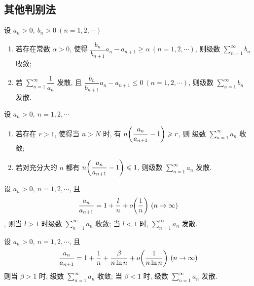 \subsection{其他判别法}

\begin{theorem}
    设 $a_n>0,~b_n>0~(n=1,2, \cdots )$\begin{enumerate}[label=(\arabic{*})]
        \item 若存在常数 $\alpha>0$, 使得 $\dfrac{b_n}{b_{n+1}}a_n-a_{n+1}\geqslant \alpha~(n=1,2, \cdots )$, 则级数 $\displaystyle \sum_{n=1}^{\infty}b_n$ 收敛;
        \item 若 $\displaystyle \sum_{n=1}^{\infty}\dfrac{1}{a_n}$ 发散, 且 $\dfrac{b_n}{b_{n+1}}a_n-a_{n+1}\leqslant 0~(n=1,2, \cdots )$, 则级数 $\displaystyle \sum_{n=1}^{\infty}b_n$ 发散.
    \end{enumerate}
\end{theorem}

\begin{theorem}
    设 $a_n>0,~n=1,2, \cdots $\begin{enumerate}[label=(\arabic{*})]
        \item 若存在 $r>1$, 使得当 $n>N$ 时, 有 $n\qty(\dfrac{a_n}{a_{n+1}}-1)\geqslant r$, 则 级数 $\displaystyle \sum_{n=1}^{\infty}a_n$ 收敛;
        \item 若对充分大的 $n$ 都有 $n\qty(\dfrac{a_n}{a_{n+1}}-1)\leqslant 1$, 则级数 $\displaystyle \sum_{n=1}^{\infty}a_n$ 发散.
    \end{enumerate}
\end{theorem}

\begin{theorem}
    设 $a_n>0,~n=1,2, \cdots $, 且 $$\dfrac{a_n}{a_{n+1}}=1+\dfrac{l}{n}+o\qty(\dfrac{1}{n}) ~(n\to \infty)$$, 则当 $l>1$ 时级数 $\displaystyle \sum_{n=1}^{\infty} a_n$ 收敛; 当 $l<1$ 时, $\displaystyle \sum_{n=1}^{\infty} a_n$ 发散.
\end{theorem}

\begin{theorem}
    设 $a_n>0,~n=1,2, \cdots $, 且 $$
        \dfrac{a_n}{a_{n+1}}=1+\dfrac{1}{n}+\dfrac{\beta}{n\ln n}+o\qty(\dfrac{1}{n\ln n})~(n\to \infty)
    $$
    则当 $\beta>1$ 时, 级数 $\displaystyle \sum_{n=1}^{\infty} a_n$ 收敛; 当 $\beta<1$ 时, 级数 $\displaystyle \sum_{n=1}^{\infty} a_n$ 发散.
\end{theorem}

